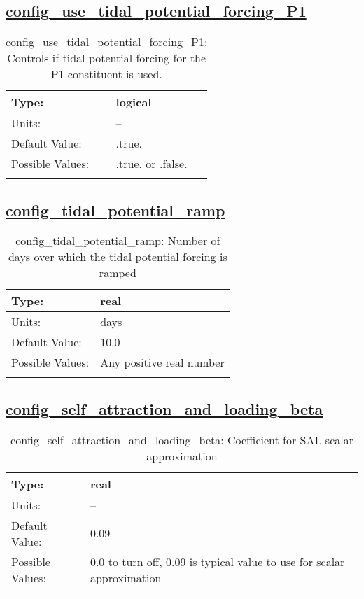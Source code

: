 \subsection[config\_use\_tidal\_potential\_forcing\_P1]{\hyperref[sec:nm_tab_tidal_potential_forcing]{config\_use\_tidal\_potential\_forcing\_P1}}
\label{subsec:nm_sec_config_use_tidal_potential_forcing_P1}
\begin{center}
\begin{longtable}{| p{2.0in} || p{4.0in} |}
    \hline
    Type: & logical \\
    \hline
    Units: & -- \\
    \hline
    Default Value: & .true. \\
    \hline
    Possible Values: & .true. or .false. \\
    \hline
    \caption{config\_use\_tidal\_potential\_forcing\_P1: Controls if tidal potential forcing for the P1 constituent is used.}
\end{longtable}
\end{center}
\subsection[config\_tidal\_potential\_ramp]{\hyperref[sec:nm_tab_tidal_potential_forcing]{config\_tidal\_potential\_ramp}}
\label{subsec:nm_sec_config_tidal_potential_ramp}
\begin{center}
\begin{longtable}{| p{2.0in} || p{4.0in} |}
    \hline
    Type: & real \\
    \hline
    Units: & \si{days} \\
    \hline
    Default Value: & 10.0 \\
    \hline
    Possible Values: & Any positive real number \\
    \hline
    \caption{config\_tidal\_potential\_ramp: Number of days over which the tidal potential forcing is ramped}
\end{longtable}
\end{center}
\subsection[config\_self\_attraction\_and\_loading\_beta]{\hyperref[sec:nm_tab_tidal_potential_forcing]{config\_self\_attraction\_and\_loading\_beta}}
\label{subsec:nm_sec_config_self_attraction_and_loading_beta}
\begin{center}
\begin{longtable}{| p{2.0in} || p{4.0in} |}
    \hline
    Type: & real \\
    \hline
    Units: & -- \\
    \hline
    Default Value: & 0.09 \\
    \hline
    Possible Values: & 0.0 to turn off, 0.09 is typical value to use for scalar approximation \\
    \hline
    \caption{config\_self\_attraction\_and\_loading\_beta: Coefficient for SAL scalar approximation}
\end{longtable}
\end{center}
